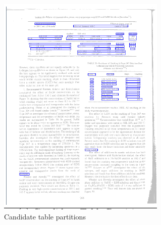 \begin{figure}[t]
\begin{subfigure}{0.31\textwidth}
\includegraphics[width=\linewidth]{img/tableDetection/tableDetectionCandidate.pdf}
\caption{Candidate table partitions}
\label{fig:tessTableDet3}
\end{subfigure}
\hspace*{\fill}
\begin{subfigure}{0.31\textwidth}

\end{subfigure}
\end{figure}
